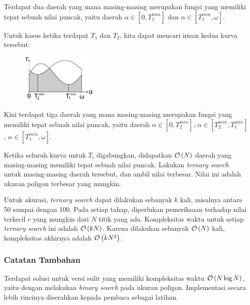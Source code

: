 \documentclass[../main_editorial.tex]{subfiles} %
\begin{document}
Terdapat dua daerah yang mana masing-masing merupakan fungsi yang memiliki tepat sebuah nilai puncak, yaitu daerah $\alpha \in [0, T_1^{min}]$ dan $\alpha \in [T_1^{min}, \omega]$.

Untuk kasus ketika terdapat $T_1$ dan $T_2$, kita dapat mencari irisan kedua kurva tersebut:

\begin{figure}[!h]
	\centering
	\includegraphics[width=0.35\textwidth]{balon/asset/hard-chart2.pdf}
\end{figure}

Kini terdapat tiga daerah yang mana masing-masing merupakan fungsi yang memiliki tepat sebuah nilai puncak, yaitu daerah $\alpha \in [0, T_2^{min}]$, $\alpha \in [T_2^{min}, T_1^{min}]$, $\alpha \in [T_1^{min}, \omega]$.

Ketika seluruh kurva untuk $T_i$ digabungkan, didapatkan $\mathcal{O}\left( N \right)$ daerah yang masing-masing memiliki tepat sebuah nilai puncak. Lakukan \textit{ternary search} untuk masing-masing daerah tersebut, dan ambil nilai terbesar. Nilai ini adalah ukuran poligon terbesar yang mungkin.

Untuk akurasi, \textit{ternary search} dapat dilakukan sebanyak $k$ kali, misalnya antara 50 sampai dengan 100. Pada setiap tahap, diperlukan pemeriksaan terhadap nilai terkecil $r$ yang mungkin dari $N$ titik yang ada. Kompleksitas waktu untuk setiap \textit{ternary search} ini adalah $\mathcal{O}\left( kN \right)$. Karena dilakukan sebanyak $\mathcal{O}\left( N \right)$ kali, kompleksitas akhirnya adalah  $\mathcal{O}\left( kN^2 \right)$.


\subsubsection*{Catatan Tambahan}

Terdapat solusi untuk versi sulit yang memiliki kompleksitas waktu $\mathcal{O}\left( N \log{N} \right)$, yaitu dengan melakukan \textit{binary search} pada ukuran poligon. Implementasi secara lebih rincinya diserahkan kepada pembaca sebagai latihan. 
\end{document}
